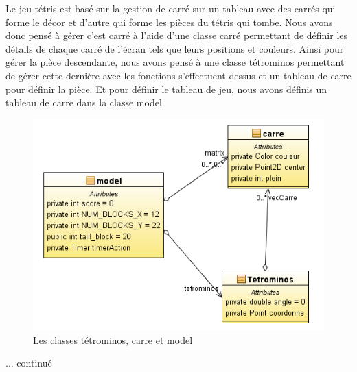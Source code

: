 \documentclass{article}           %
\begin{document}
Le jeu tétris est basé sur la gestion de carré sur un tableau avec des carrés qui forme le décor et d'autre qui forme les pièces du tétris qui tombe. Nous avons donc pensé à gérer c'est carré à l'aide d'une classe carré permettant de définir les détails de chaque carré de l’écran tels que leurs positions et couleurs. Ainsi pour gérer la pièce descendante, nous avons pensé à une classe tétrominos permettant de gérer cette dernière avec les fonctions s’effectuent dessus et un tableau de carre pour définir la pièce. Et pour définir le tableau de jeu, nous avons définis un tableau de carre dans la classe model.

\begin{figure}[h]
   \caption{Les classes tétrominos, carre et model }
   \includegraphics{diagram2.png}
\end{figure}

... continué


\newpage
\end{document}
